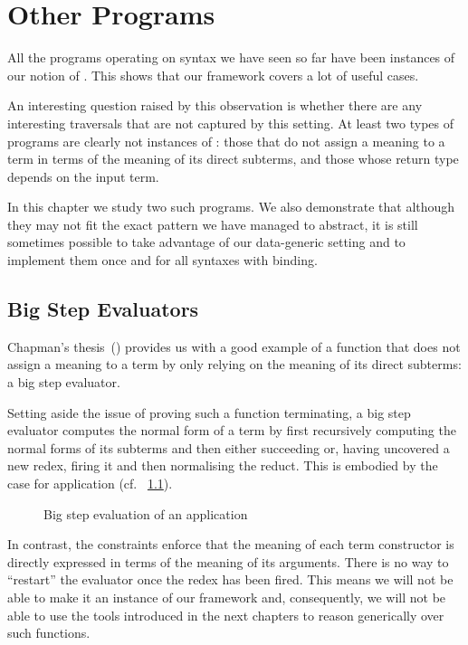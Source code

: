 \chapter{Other Programs}

All the programs operating on syntax we have seen so far have been
instances of our notion of . This shows that our
framework covers a lot of useful cases.

An interesting question raised by this observation is whether there
are any interesting traversals that are not captured by this setting.
At least two types of programs are clearly not instances of :
those that do not assign a meaning to a term in terms of the meaning of
its direct subterms, and those whose return type depends on the input
term.

In this chapter we study two such programs. We also demonstrate that
although they may not fit the exact pattern we have managed to abstract,
it is still sometimes possible to take advantage of our data-generic
setting and to implement them once and for all syntaxes with binding.

\section{Big Step Evaluators}

Chapman's thesis~(\citeyear{chapman2009type}) provides us with a good
example of a function that does not assign a meaning to a term by only
relying on the meaning of its direct subterms: a big step evaluator.

Setting aside the issue of proving such a function terminating, a big
step evaluator computes the normal form of a term by first recursively
computing the normal forms of its subterms and then either succeeding
or, having uncovered a new redex, firing it and then normalising the
reduct. This is embodied by the case for application
(cf. ~\cref{figure:bigstepapp}).

\begin{figure}
\caption{Big step evaluation of an application}\label{figure:bigstepapp}
\end{figure}

In contrast, the  constraints enforce that the meaning
of each term constructor is directly expressed in terms of the meaning
of its arguments. There is no way to ``restart'' the evaluator once the
redex has been fired. This means we will not be able to make it an
instance of our framework and, consequently, we will not be able to use
the tools introduced in the next chapters to reason generically over
such functions.


